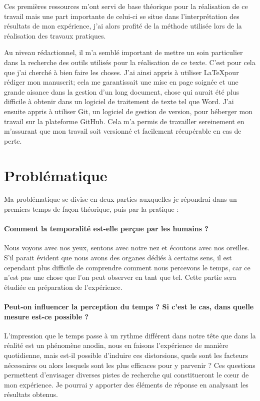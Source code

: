 \documentclass[12pt,fleqn,oneside,openany]{book} %
\begin{document}
Ces premières ressources m'ont servi de base théorique pour la réalisation de ce travail mais une part importante de celui-ci se situe dans l'interprétation des résultats de mon expérience, j'ai alors profité de la méthode utilisée lors de la réalisation des travaux pratiques. 

Au niveau rédactionnel, il m'a semblé important de mettre un soin particulier dans la recherche des outils utilisés pour la réalisation de ce texte. C'est pour cela que j'ai cherché à bien faire les choses. J'ai ainsi appris à utiliser \LaTeX pour rédiger mon manuscrit; cela me garantissait une mise en page soignée et une grande aisance dans la gestion d'un long document, chose qui aurait été plus difficile à obtenir dans un logiciel de traitement de texte tel que Word. J'ai ensuite appris à utiliser Git, un logiciel de gestion de version, pour héberger mon travail sur la plateforme GitHub. Cela m'a permis de travailler sereinement en m'assurant que mon travail soit versionné et facilement récupérable en cas de perte.

\section{Problématique} \label{sec:problematique}
Ma problématique se divise en deux parties auxquelles je répondrai dans un premiers temps de façon théorique, puis par la pratique :

\paragraph{Comment la temporalité est-elle perçue par les humains ?} Nous voyons avec nos yeux, sentons avec notre nez et écoutons avec nos oreilles. S'il parait évident que nous avons des organes dédiés à certains sens, il est cependant plus difficile de comprendre comment nous percevons le temps, car ce n'est pas une chose que l'on peut observer en tant que tel. Cette partie sera étudiée en préparation de l'expérience. 

\paragraph{Peut-on influencer la perception du temps ? Si c'est le cas, dans quelle mesure est-ce possible ?} L'impression que le temps passe à un rythme différent dans notre tête que dans la réalité est un phénomène anodin, nous en faisons l'expérience de manière quotidienne, mais est-il possible d'induire ces distorsions, quels sont les facteurs nécessaires ou alors lesquels sont les plus efficaces pour y parvenir ? Ces questions permettent d'envisager diverses pistes de recherche qui constitueront le cœur de mon expérience. Je pourrai y apporter des éléments de réponse en analysant les résultats obtenus. %
\end{document}
